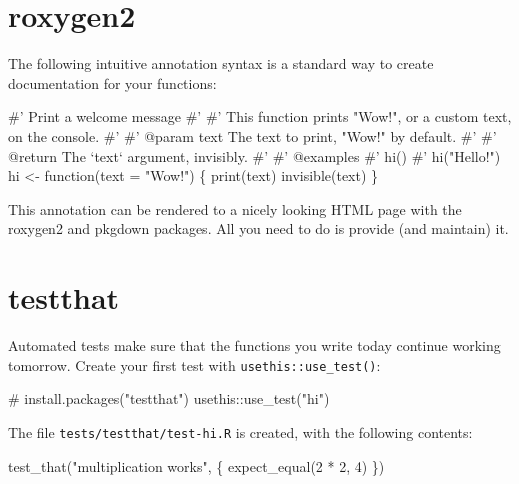 \documentclass[]{book}
\newenvironment{Shaded}{}{}
\newcommand{\CommentTok}[1]{\textcolor[rgb]{0.00,0.50,0.00}{#1}}
\newcommand{\ControlFlowTok}[1]{\textcolor[rgb]{0.00,0.00,1.00}{#1}}
\newcommand{\DataTypeTok}[1]{#1}
\newcommand{\DecValTok}[1]{#1}
\newcommand{\KeywordTok}[1]{\textcolor[rgb]{0.00,0.00,1.00}{#1}}
\newcommand{\NormalTok}[1]{#1}
\newcommand{\OperatorTok}[1]{#1}
\newcommand{\StringTok}[1]{\textcolor[rgb]{0.00,0.50,0.50}{#1}}
\begin{document}
\hypertarget{roxygen2}{%
\section{roxygen2}\label{roxygen2}}

The following intuitive annotation syntax is a standard way to create documentation for your functions:

\begin{Shaded}
\begin{Highlighting}[]
\CommentTok{#' Print a welcome message}
\CommentTok{#' }
\CommentTok{#' This function prints "Wow!", or a custom text, on the console.}
\CommentTok{#'}
\CommentTok{#' @param text The text to print, "Wow!" by default.}
\CommentTok{#' }
\CommentTok{#' @return The `text` argument, invisibly.}
\CommentTok{#' }
\CommentTok{#' @examples}
\CommentTok{#' hi()}
\CommentTok{#' hi("Hello!")}
\NormalTok{hi <-}\StringTok{ }\ControlFlowTok{function}\NormalTok{(}\DataTypeTok{text =} \StringTok{"Wow!"}\NormalTok{) \{}
  \KeywordTok{print}\NormalTok{(text)}
  \KeywordTok{invisible}\NormalTok{(text)}
\NormalTok{\}}
\end{Highlighting}
\end{Shaded}

This annotation can be rendered to a nicely looking HTML page with the roxygen2 and pkgdown packages.
All you need to do is provide (and maintain) it.

\hypertarget{testthat}{%
\section{testthat}\label{testthat}}

Automated tests make sure that the functions you write today continue working tomorrow.
Create your first test with \texttt{usethis::use\_test()}:

\begin{Shaded}
\begin{Highlighting}[]
\CommentTok{# install.packages("testthat")}
\NormalTok{usethis}\OperatorTok{::}\KeywordTok{use_test}\NormalTok{(}\StringTok{"hi"}\NormalTok{)}
\end{Highlighting}
\end{Shaded}

The file \texttt{tests/testthat/test-hi.R} is created, with the following contents:

\begin{Shaded}
\begin{Highlighting}[]
\KeywordTok{test_that}\NormalTok{(}\StringTok{"multiplication works"}\NormalTok{, \{}
  \KeywordTok{expect_equal}\NormalTok{(}\DecValTok{2} \OperatorTok{*}\StringTok{ }\DecValTok{2}\NormalTok{, }\DecValTok{4}\NormalTok{)}
\NormalTok{\})}
\end{Highlighting}
\end{Shaded}
\end{document}
